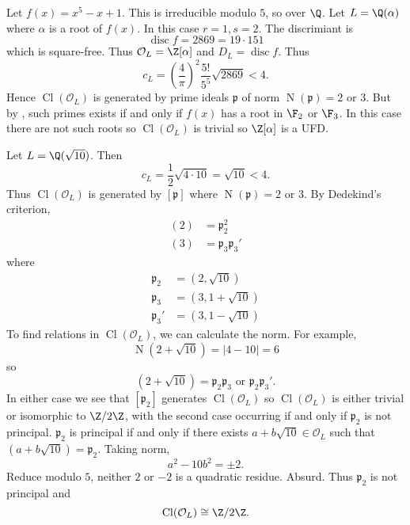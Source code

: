 \documentclass[a4paper]{article}
\renewcommand*{\O}{\mathcal{O}}
\DeclareMathOperator{\n}{N}
\DeclareMathOperator{\disc}{disc}
\DeclareMathOperator{\Cl}{Cl} %
\begin{document}
\begin{eg}\leavevmode
  Let \(f(x) = x^5 - x + 1\). This is irreducible modulo \(5\), so over \(\Q\). Let \(L = \Q(\alpha)\) where \(\alpha\) is a root of \(f(x)\). In this case \(r = 1, s = 2\). The discrimiant is
  \[
    \disc f = 2869 = 19 \cdot 151
  \]
  which is square-free. Thus \(\O_L = \Z[\alpha]\) and \(D_L = \disc f\). Thus
  \[
    c_L = \left( \frac{4}{\pi} \right)^2 \frac{5!}{5^5} \sqrt{2869} < 4.
  \]
  Hence \(\Cl(\O_L)\) is generated by prime ideals \(\mathfrak{p}\) of norm \(\n(\mathfrak{p}) = 2\) or \(3\). But by , such primes exists if and only if \(f(x)\) has a root in \(\F_2\) or \(\F_3\). In this case there are not such roots so \(\Cl(\O_L)\) is trivial so \(\Z[\alpha]\) is a UFD.
\end{eg}

\begin{eg}
  Let \(L = \Q(\sqrt{10})\). Then
  \[
    c_L = \frac{1}{2} \sqrt{4 \cdot 10} = \sqrt{10} < 4.
  \]
  Thus \(\Cl(\O_L)\) is generated by \([\mathfrak{p}]\) where \(\n(\mathfrak{p}) = 2\) or \(3\). By Dedekind's criterion,
  \begin{align*}
    (2) &= \mathfrak p_2^2 \\
    (3) &= \mathfrak p_3 \mathfrak p_3'
  \end{align*}
  where
  \begin{align*}
    \mathfrak p_2 &= (2, \sqrt{10}) \\
    \mathfrak p_3 &= (3, 1 + \sqrt{10}) \\
    \mathfrak p_3' &= (3, 1 - \sqrt{10})
  \end{align*}
  To find relations in \(\Cl(\O_L)\), we can calculate the norm. For example,
  \[
    \n(2 + \sqrt{10}) = |4 - 10| = 6
  \]
  so
  \[
    (2 + \sqrt{10}) = \mathfrak p_2 \mathfrak p_3 \text{ or } \mathfrak p_2 \mathfrak p_3'.
  \]
  In either case we see that \([\mathfrak p_2]\) generates \(\Cl(\O_L)\) so \(\Cl(\O_L)\) is either trivial or isomorphic to \(\Z/2\Z\), with the second case occurring if and only if \(\mathfrak p_2\) is not principal. \(\mathfrak p_2\) is principal if and only if there exists \(a + b \sqrt{10} \in \O_L\) such that \((a + b \sqrt{10}) = \mathfrak p_2\). Taking norm,
  \[
    a^2 - 10b^2 = \pm 2.
  \]
  Reduce modulo \(5\), neither \(2\) or \(-2\) is a quadratic residue. Absurd. Thus \(\mathfrak p_2\) is not principal and
  \[
    \Cl(\O_L) \cong \Z/2\Z.
  \]
\end{eg}
\end{document}
